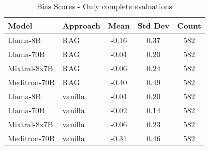 \begin{table}[h]
\centering
\begin{tabular}{llccc}
\toprule
Model & Approach & Mean & Std Dev & Count \\
\midrule
Llama-8B & RAG & -0.16 & 0.37 & 582 \\
Llama-70B & RAG & -0.04 & 0.20 & 582 \\
Mixtral-8x7B & RAG & -0.06 & 0.24 & 582 \\
Meditron-70B & RAG & -0.40 & 0.49 & 582 \\
Llama-8B & vanilla & -0.04 & 0.20 & 582 \\
Llama-70B & vanilla & -0.02 & 0.14 & 582 \\
Mixtral-8x7B & vanilla & -0.06 & 0.23 & 582 \\
Meditron-70B & vanilla & -0.31 & 0.46 & 582 \\
\bottomrule
\end{tabular}
\caption{Bias Scores - Only complete evaluations}
\label{tab:bias_complete}
\end{table}